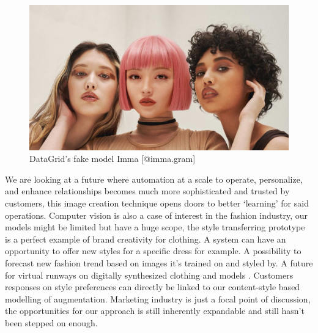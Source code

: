 \documentclass[preprint,12pt]{elsarticle}
\begin{document}
\begin{figure}[!h]
\centering\includegraphics[width=0.7\linewidth]{dims.jpg}
\caption{DataGrid's fake model Imma [@imma.gram]}
\label{fig:imma}
\end{figure}

We are looking at a future where automation at a scale to operate, personalize, and enhance relationships becomes much more sophisticated and trusted by customers, this image creation technique opens doors to better ‘learning’ for said operations. Computer vision is also a case of interest in the fashion industry, our models might be limited but have a huge scope, the style transferring prototype is a perfect example of brand creativity for clothing. A system can have an opportunity to offer new styles for a specific dress for example. A possibility to forecast new fashion trend based on images it’s trained on and styled by. A future for virtual runways on digitally synthesized clothing and models \cite{Gum2017Fash}.  Customers responses on style preferences can directly be linked to our content-style based modelling of augmentation.  Marketing industry is just a focal point of discussion, the opportunities for our approach is still inherently expandable and still hasn’t been stepped on enough. 



\end{document}
